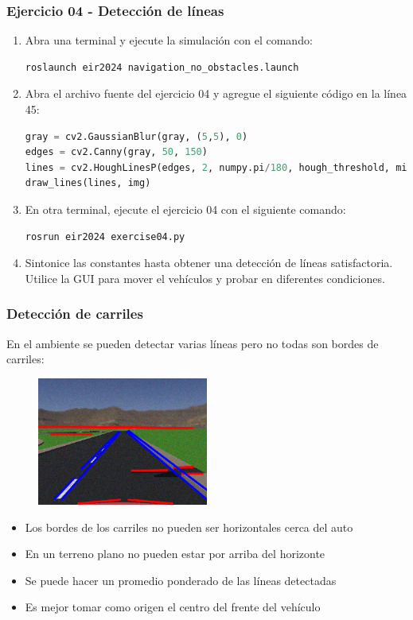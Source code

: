 \begin{frame}[containsverbatim]\frametitle{Ejercicio 04 - Detección de líneas}
  \begin{enumerate}
  \item Abra una terminal y ejecute la simulación con el comando:
    \begin{lstlisting}[language=bash,numbers=none]
roslaunch eir2024 navigation_no_obstacles.launch
    \end{lstlisting}
  \item Abra el archivo fuente del ejercicio 04 y agregue el siguiente código en la línea 45:
    \begin{lstlisting}[language=Python, firstnumber=45]
gray = cv2.GaussianBlur(gray, (5,5), 0)
edges = cv2.Canny(gray, 50, 150)
lines = cv2.HoughLinesP(edges, 2, numpy.pi/180, hough_threshold, minLineLength=min_length, maxLineGap=max_gap)
draw_lines(lines, img)
    \end{lstlisting}
  \item En otra terminal, ejecute el ejercicio 04 con el siguiente comando:
    \begin{lstlisting}[language=bash,numbers=none]
rosrun eir2024 exercise04.py
    \end{lstlisting}
  \item Sintonice las constantes hasta obtener una detección de líneas satisfactoria. Utilice la GUI para mover el vehículos y probar en diferentes condiciones. 
  \end{enumerate}
\end{frame}

\begin{frame}\frametitle{Detección de carriles}
  En el ambiente se pueden detectar varias líneas pero no todas son bordes de carriles:
  \begin{figure}
    \centering
    \includegraphics[width=0.5\textwidth]{Figuras/LineFiltering.png}
  \end{figure}
  \begin{itemize}
  \item Los bordes de los carriles no pueden ser horizontales cerca del auto
  \item En un terreno plano no pueden estar por arriba del horizonte
  \item Se puede hacer un promedio ponderado de las líneas detectadas
  \item Es mejor tomar como origen el centro del frente del vehículo 
  \end{itemize}
\end{frame}

